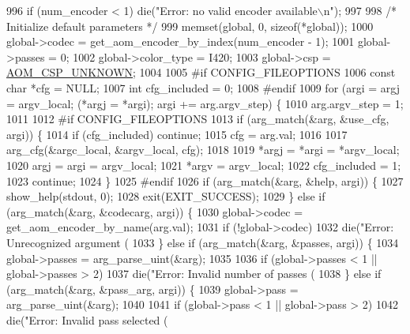 \begin{DoxyCodeInclude}
{{{{{{{{{{{996   \textcolor{keywordflow}{if} (num\_encoder < 1) die(\textcolor{stringliteral}{"Error: no valid encoder available\(\backslash\)n"});
997 
998   \textcolor{comment}{/* Initialize default parameters */}
999   memset(global, 0, \textcolor{keyword}{sizeof}(*global));
1000   global->codec = get\_aom\_encoder\_by\_index(num\_encoder - 1);
1001   global->passes = 0;
1002   global->color\_type = I420;
1003   global->csp = \hyperlink{aom__image_8h_a10590253ef3dbde7e93ed5d4b4e0e73ba7843506f3e28f720be0d4f03237fb48c}{AOM\_CSP\_UNKNOWN};
1004 
1005 \textcolor{preprocessor}{#if CONFIG\_FILEOPTIONS}
1006   \textcolor{keyword}{const} \textcolor{keywordtype}{char} *cfg = NULL;
1007   \textcolor{keywordtype}{int} cfg\_included = 0;
1008 \textcolor{preprocessor}{#endif}
1009   \textcolor{keywordflow}{for} (argi = argj = argv\_local; (*argj = *argi); argi += arg.argv\_step) \{
1010     arg.argv\_step = 1;
1011 
1012 \textcolor{preprocessor}{#if CONFIG\_FILEOPTIONS}
1013     \textcolor{keywordflow}{if} (arg\_match(&arg, &use\_cfg, argi)) \{
1014       \textcolor{keywordflow}{if} (cfg\_included) \textcolor{keywordflow}{continue};
1015       cfg = arg.val;
1016 
1017       arg\_cfg(&argc\_local, &argv\_local, cfg);
1018 
1019       *argj = *argi = *argv\_local;
1020       argj = argi = argv\_local;
1021       *argv = argv\_local;
1022       cfg\_included = 1;
1023       \textcolor{keywordflow}{continue};
1024     \}
1025 \textcolor{preprocessor}{#endif}
1026     \textcolor{keywordflow}{if} (arg\_match(&arg, &help, argi)) \{
1027       show\_help(stdout, 0);
1028       exit(EXIT\_SUCCESS);
1029     \} \textcolor{keywordflow}{else} \textcolor{keywordflow}{if} (arg\_match(&arg, &codecarg, argi)) \{
1030       global->codec = get\_aom\_encoder\_by\_name(arg.val);
1031       \textcolor{keywordflow}{if} (!global->codec)
1032         die(\textcolor{stringliteral}{"Error: Unrecognized argument (%
1033     \} \textcolor{keywordflow}{else} \textcolor{keywordflow}{if} (arg\_match(&arg, &passes, argi)) \{
1034       global->passes = arg\_parse\_uint(&arg);
1035 
1036       \textcolor{keywordflow}{if} (global->passes < 1 || global->passes > 2)
1037         die(\textcolor{stringliteral}{"Error: Invalid number of passes (%
1038     \} \textcolor{keywordflow}{else} \textcolor{keywordflow}{if} (arg\_match(&arg, &pass\_arg, argi)) \{
1039       global->pass = arg\_parse\_uint(&arg);
1040 
1041       \textcolor{keywordflow}{if} (global->pass < 1 || global->pass > 2)
1042         die(\textcolor{stringliteral}{"Error: Invalid pass selected (%
}}}}}}}}}}}}}}
\end{DoxyCodeInclude}
